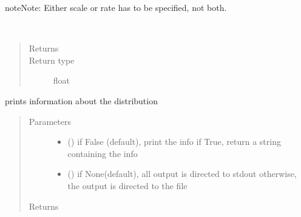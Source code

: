 \documentclass[letterpaper,10pt,english]{sphinxmanual}
\begin{document}
\begin{fulllineitems}
\begin{description}
\end{description}

\begin{sphinxadmonition}{note}{Note:}
Either scale or rate has to be specified, not both.
\end{sphinxadmonition}

\begin{fulllineitems}
\label{\detokenize{Reference:salabim.Gamma.mean}}~\begin{quote}\begin{description}
\item[{Returns}] \leavevmode
{}

\item[{Return type}] \leavevmode
float

\end{description}\end{quote}

\end{fulllineitems}


\begin{fulllineitems}
\label{\detokenize{Reference:salabim.Gamma.print_info}}
prints information about the distribution
\begin{quote}\begin{description}
\item[{Parameters}] \leavevmode\begin{itemize}
\item {} 
 () \textendash{} if False (default), print the info
if True, return a string containing the info

\item {} 
 () \textendash{} if None(default), all output is directed to stdout 
otherwise, the output is directed to the file

\end{itemize}

\item[{Returns}] \leavevmode
{}


\end{description}
\end{quote}
\end{fulllineitems}
\end{fulllineitems}
\end{document}
